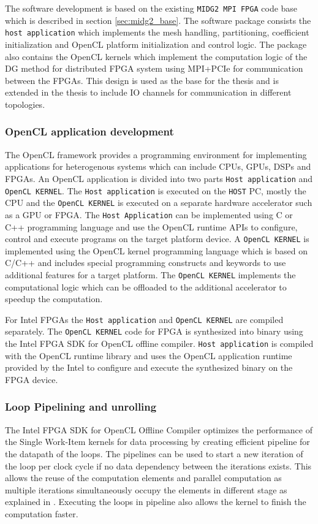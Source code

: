 The software development is based on the existing \texttt{MIDG2 MPI FPGA} code base
which is described in section \ref{sec:midg2_base}. The software package consists
the \texttt{host application} which implements the mesh handling, partitioning,
coefficient initialization and OpenCL platform initialization and control
logic. The package also contains the OpenCL kernels which implement
the computation logic of the DG method for distributed FPGA system using
MPI+PCIe for communication between the FPGAs. This design is used as the base
for the thesis and is extended in the thesis to include IO channels for communication
in different topologies.

\subsubsection{OpenCL application development}

The OpenCL framework provides a programming environment for implementing
applications for heterogenous systems which can include CPUs, GPUs,
DSPs and FPGAs. An OpenCL application is divided into two parts \texttt{Host application} and
\texttt{OpenCL KERNEL}. The \texttt{Host application} is executed on the \texttt{HOST} PC,
mostly the CPU and the \texttt{OpenCL KERNEL} is executed on a separate hardware accelerator
such as a GPU or FPGA. The \texttt{Host Application} can be implemented using
C or C++ programming language and use the OpenCL runtime APIs to configure, control
and execute programs on the target platform device. A \texttt{OpenCL KERNEL} is
implemented using the OpenCL kernel programming language which is based on C/C++
and includes special programming constructs and keywords to use additional features
for a target platform. The \texttt{OpenCL KERNEL} implements the computational
logic which can be offloaded to the additional accelerator to speedup the computation.

For Intel FPGAs the \texttt{Host application} and \texttt{OpenCL KERNEL} are compiled separately.
The \texttt{OpenCL KERNEL} code for FPGA is synthesized into binary using the Intel FPGA SDK for OpenCL
offline compiler. \texttt{Host application} is compiled with the OpenCL runtime library and uses the
OpenCL application runtime provided by the Intel to configure and execute the synthesized binary on the FPGA device.

\subsubsection{Loop Pipelining and unrolling}
The Intel FPGA SDK for OpenCL Offline Compiler optimizes the performance
of the Single Work-Item kernels for data processing by creating efficient
pipeline for the datapath of the loops. The pipelines can be used to
start a new iteration of the loop per clock cycle if no data dependency
between the iterations exists. This allows the reuse of the computation
elements and parallel computation as multiple iterations simultaneously
occupy the elements in different stage as explained in \cite{noauthor_intel_2019_best, section 2.8.5}.
Executing the loops in pipeline also allows the kernel to finish the computation
faster.

